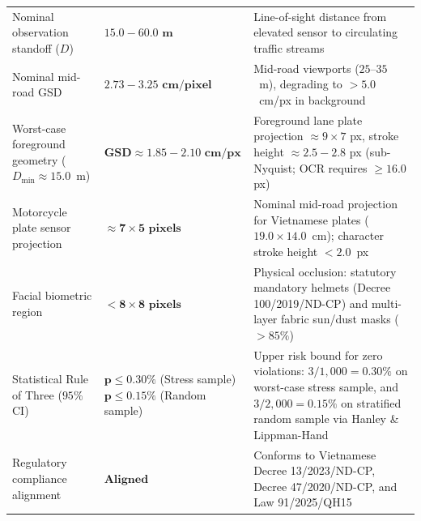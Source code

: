 \begin{table}[!htbp]
\begin{tabularx}{\textwidth}{@{} >{\raggedright\arraybackslash}p{5.2cm} >{\raggedright\arraybackslash}p{3.8cm} >{\raggedright\arraybackslash}X @{}}
\addlinespace[1.5pt]
Nominal observation standoff ($D$) & $\mathbf{15.0 - 60.0\text{ m}}$ & Line-of-sight distance from elevated sensor to circulating traffic streams \\
\addlinespace[1.5pt]
Nominal mid-road GSD & $\mathbf{2.73 - 3.25\text{ cm/pixel}}$ & Mid-road viewports ($25$--$35$~m), degrading to $>5.0$~cm/px in background \\
\addlinespace[1.5pt]
Worst-case foreground geometry ($D_{\min} \approx 15.0$~m) & $\mathbf{\text{GSD} \approx 1.85 - 2.10\text{ cm/px}}$ & Foreground lane plate projection $\approx 9 \times 7$ px, stroke height $\approx 2.5 - 2.8$ px (sub-Nyquist; OCR requires $\ge 16.0$ px) \\
\addlinespace[1.5pt]
Motorcycle plate sensor projection & $\mathbf{\approx 7 \times 5\text{ pixels}}$ & Nominal mid-road projection for Vietnamese plates ($19.0 \times 14.0$~cm); character stroke height $< 2.0$~px \\
\addlinespace[1.5pt]
Facial biometric region & $\mathbf{< 8 \times 8\text{ pixels}}$ & Physical occlusion: statutory mandatory helmets (Decree 100/2019/ND-CP) and multi-layer fabric sun/dust masks ($>85\%$) \\
\addlinespace[1.5pt]
Statistical Rule of Three ($95\%$ CI) & $\mathbf{p \le 0.30\%}$ (Stress sample) \newline $\mathbf{p \le 0.15\%}$ (Random sample) & Upper risk bound for zero violations: $3/1,000 = 0.30\%$ on worst-case stress sample, and $3/2,000 = 0.15\%$ on stratified random sample via Hanley \& Lippman-Hand~\cite{hanley1983if} \\
\addlinespace[1.5pt]
Regulatory compliance alignment & $\mathbf{Aligned}$ & Conforms to Vietnamese Decree 13/2023/ND-CP, Decree 47/2020/ND-CP, and Law 91/2025/QH15 \\
\bottomrule
\end{tabularx}
\end{table}
